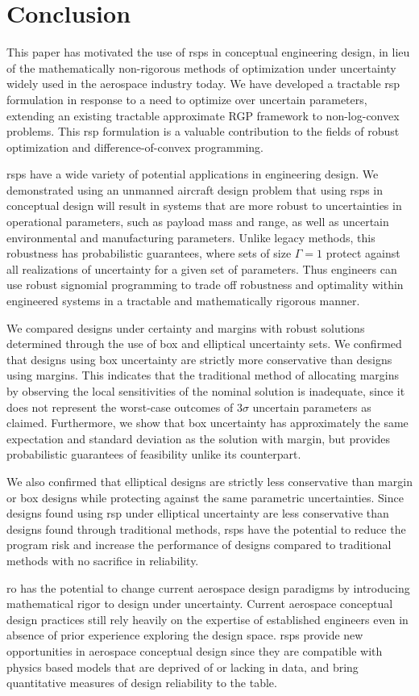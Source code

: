 \section{Conclusion}

This paper has motivated the use of \gls{rsp}s in conceptual engineering
design, in lieu of the mathematically non-rigorous methods of optimization under uncertainty
widely used in the aerospace industry today. We have developed a tractable \gls{rsp} formulation
in response to a need to optimize over uncertain parameters, extending an
existing tractable approximate RGP framework to non-log-convex problems.
This \gls{rsp} formulation is a valuable contribution to the fields of robust
optimization and difference-of-convex programming.

\gls{rsp}s have a wide variety of potential applications in engineering design.
We demonstrated using an unmanned aircraft design problem
that using \gls{rsp}s in conceptual design will result in systems
that are more robust to uncertainties in operational parameters,
such as payload mass and range, as well as uncertain environmental and manufacturing parameters.
Unlike legacy methods, this robustness has probabilistic guarantees, where sets of size $\Gamma=1$
protect against all realizations of uncertainty for a given set of parameters.
Thus engineers can use robust signomial programming to trade off
robustness and optimality within engineered systems in a tractable and mathematically rigorous manner.

We compared designs under certainty and margins with robust solutions
determined through the use of box and elliptical uncertainty sets. We
confirmed that designs using box uncertainty are strictly more conservative
than designs using margins. This indicates that the traditional method of allocating margins
by observing the local sensitivities of the nominal solution is inadequate, since it does not
represent the worst-case outcomes of $3\sigma$ uncertain parameters as claimed.
Furthermore, we show that box uncertainty
has approximately the same expectation and standard deviation as the solution with margin,
but provides probabilistic guarantees of feasibility unlike its counterpart.

We also confirmed that elliptical designs are strictly less conservative
than margin or box designs while protecting against the same
parametric uncertainties. Since designs found using \gls{rsp}
under elliptical uncertainty are less conservative
than designs found through traditional methods, \gls{rsp}s have the potential to reduce
the program risk and increase the performance
of designs compared to traditional methods with no sacrifice in reliability.

\gls{ro} has the potential to change current aerospace design paradigms by introducing
mathematical rigor to design under uncertainty. Current aerospace
conceptual design practices still rely heavily on the expertise of established
engineers even in absence of prior experience exploring the design space.
\gls{rsp}s provide new opportunities in aerospace conceptual design
since they are compatible with physics based models
that are deprived of or lacking in data, and bring quantitative
measures of design reliability to the table.
